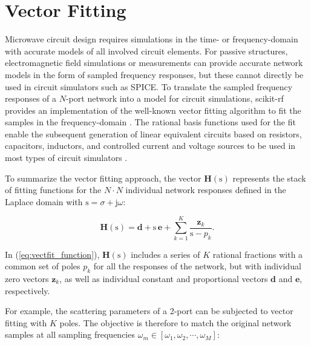 \documentclass[journal, onecolumn]{IEEEtran}
\begin{document}
\section{Vector Fitting}
Microwave circuit design requires simulations in the time- or frequency-domain with accurate models of all involved circuit elements. For passive structures, electromagnetic field simulations or measurements can provide accurate network models in the form of sampled frequency responses, but these cannot directly be used in circuit simulators such as SPICE. To translate the sampled frequency responses of a $N$-port network into a model for circuit simulations, scikit-rf provides an implementation of the well-known vector fitting algorithm to fit the samples in the frequency-domain \cite{vectfit}. The rational basis functions used for the fit enable the subsequent generation of linear equivalent circuits based on resistors, capacitors, inductors, and controlled current and voltage sources to be used in most types of circuit simulators \cite{vectfit_spice}. 

To summarize the vector fitting approach, the vector $\mathbf{H}(\mathrm{s})$ represents the stack of fitting functions for the $N \cdot N$ individual network responses defined in the Laplace domain with $\mathrm{s} = \sigma + \mathrm{j} \omega$:

\begin{equation}
\mathbf{H}(\mathrm{s}) = \mathbf{d} + \mathrm{s} \, \mathbf{e} + \sum _{k=1} ^{K} \frac{\mathbf{z}_k}{\mathrm{s} - p_k}.
\label{eq:vectfit_function}
\end{equation}

In (\ref{eq:vectfit_function}), $\mathbf{H}(\mathrm{s})$ includes a series of $K$ rational fractions with a common set of poles $p_k$ for all the responses of the network, but with individual zero vectors $\mathbf{z}_{k}$, as well as individual constant and proportional vectors $\mathbf{d}$ and $\mathbf{e}$, respectively.

For example, the scattering parameters of a 2-port can be subjected to vector fitting with $K$ poles. The objective is therefore to match the original network samples at all sampling frequencies $\omega_m \in [\omega_1, \omega_2, \cdots, \omega_M]$:
\end{document}
